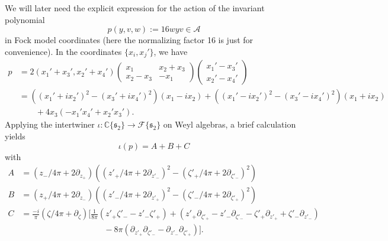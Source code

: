 \documentclass[reqno, 11pt]{amsart} %
\numberwithin{equation}{section}
\theoremstyle{plain}
\theoremstyle{definition}
\theoremstyle{remark}
\newcommand{\bbC}{\mathbb C}
\newcommand{\calA}{\mathcal A}
\newcommand{\calF}{\mathcal F}
\newcommand{\lie}[1]{ \mathfrak{#1}}
\begin{document}
We will later need the explicit expression for the action of the invariant polynomial
\[p(y,v,w) := 16 wyv \in \calA
\]
in Fock model coordinates (here the normalizing  factor 16 is just for convenience). In the coordinates $\{ x_i, x_j'\}$, we have
\begin{align*}
p  &= 2(x_1' + x_3', x_2' + x_4') \begin{pmatrix} x_1 & x_2 + x_3 \\ x_2 - x_3 & - x_1 \end{pmatrix} \begin{pmatrix} x_1' - x_3' \\ x_2' - x_4' \end{pmatrix}  \\
&=     \left( (x_1' + i x_2')^2 - (x_3'+ix_4')^2 \right) (x_1 - i x_2) +  \left(  (x_1' - i x_2' )^2 - (x_3' - i x_4')^2 \right)   (x_1 + i x_2)  \\
& \qquad +  4 x_3(-x_1'x_4'+ x_2'x_3').
\end{align*}
Applying the intertwiner  $\iota \colon \bbC\{ \lie{s_2} \} \to \calF\{\lie s_2\}$ on Weyl algebras, a brief calculation yields
\begin{equation} \label{eqn:iota_p_explicit}
\iota(p) =  A + B + C
\end{equation}
with
\begin{equation} \label{eqn:p inv Fock decomp}
\begin{aligned}
A &= \left( z_- / 4 \pi + 2 \partial_{z_+} \right) \left( \left(z'_+/4 \pi + 2 \partial_{z'_-} \right)^2  - \left( \zeta'_+/4 \pi + 2 \partial_{\zeta'_-} \right)^2 \right)   \\
B &=  \left( z_+ / 4 \pi + 2 \partial_{z_-} \right)	  \left( \left(z'_-/4 \pi + 2 \partial_{z'_+} \right)^2  - \left( \zeta'_-/4 \pi + 2 \partial_{\zeta'_+} \right)^2 \right) \\
C&= \frac{-i}{ \pi}\left( \zeta/4\pi + \partial_{\zeta} \right) \Big[ \frac{1}{8 \pi}(z'_+ \zeta'_- - z'_- \zeta'_+) + \left( z'_+ \partial_{\zeta'_+}  - z'_- \partial_{\zeta'_-} - \zeta'_+ \partial_{z'_+} + \zeta'_- \partial_{z'_-} \right) \\
& \qquad\qquad\qquad\qquad\qquad - 8 \pi ( \partial_{z'_+} \partial_{\zeta'_-} - \partial_{z'_-} \partial_{\zeta'_+}) \Big].
\end{aligned}
\end{equation}
\end{document}

